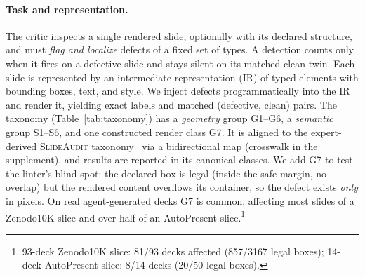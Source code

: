 \documentclass[letterpaper]{article}            %
\newcommand{\g}[1]{\textsf{#1}}        %
\begin{document}
\paragraph{Task and representation.}
The critic inspects a single rendered slide, optionally with its declared structure, and must \emph{flag and
localize} defects of a fixed set of types. A detection counts only when it fires on a defective slide and stays
silent on its matched clean twin. Each slide is represented by an intermediate representation (IR) of typed elements with bounding boxes, text,
and style. We inject defects programmatically into the IR and render it, yielding exact labels and matched
(defective, clean) pairs. The taxonomy (Table~\ref{tab:taxonomy}) has a \emph{geometry}
group \g{G1}--\g{G6}, a \emph{semantic} group \g{S1}--\g{S6}, and one constructed render class \g{G7}. It is
aligned to the expert-derived \textsc{SlideAudit} taxonomy~\citep{slideaudit} via a bidirectional map (crosswalk in
the supplement), and results are reported in its canonical classes. We add \g{G7} to test the linter's blind spot: the declared box is legal (inside the safe margin, no
overlap) but the rendered content overflows its container, so the defect exists \emph{only} in pixels. On real
agent-generated decks \g{G7} is common, affecting most slides of a Zenodo10K slice and over half of an
AutoPresent slice.\footnote{93-deck Zenodo10K slice: 81/93 decks affected (857/3167 legal boxes); 14-deck
AutoPresent slice: 8/14 decks (20/50 legal boxes).}
\end{document}
